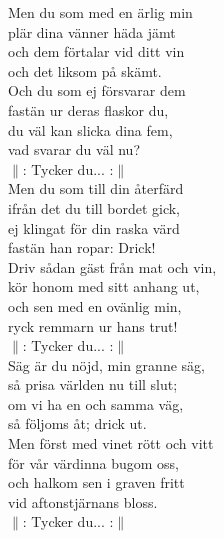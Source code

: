 \documentclass[a6paper, 10pt, twoside]{article}
\begin{document}
\begin{lyrics}
\newpage
\noindent
Men du som med en ärlig min\\
plär dina vänner häda jämt\\
och dem förtalar vid ditt vin\\
och det liksom på skämt.\\
Och du som ej försvarar dem\\
fastän ur deras flaskor du,\\
du väl kan slicka dina fem,\\
vad svarar du väl nu?
\vspace{5pt}\\
$\|$: Tycker du... :$\|$
\vspace{5pt}\\
Men du som till din återfärd\\
ifrån det du till bordet gick,\\
ej klingat för din raska värd\\
fastän han ropar: Drick!\\
Driv sådan gäst från mat och vin,\\
kör honom med sitt anhang ut,\\
och sen med en ovänlig min,\\
ryck remmarn ur hans trut!
\vspace{5pt}\\
$\|$: Tycker du... :$\|$
\vspace{5pt}\\
Säg är du nöjd, min granne säg,\\
så prisa världen nu till slut;\\
om vi ha en och samma väg,\\
så följoms åt; drick ut.\\
Men först med vinet rött och vitt\\
för vår värdinna bugom oss,\\
och halkom sen i graven fritt\\
vid aftonstjärnans bloss.
\vspace{5pt}\\
$\|$: Tycker du... :$\|$
\end{lyrics}
\end{document}
